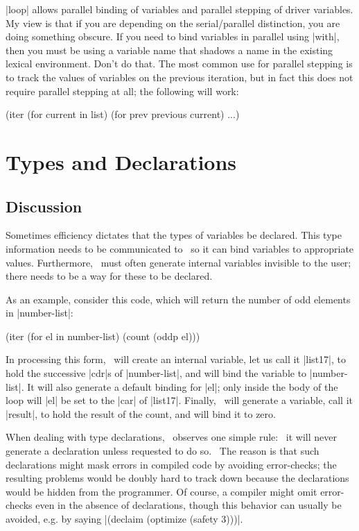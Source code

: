 |loop| allows parallel binding of variables and parallel stepping of
driver variables.  My view is that if you are depending on the 
serial/parallel distinction, you are doing something obscure.  If you
need to bind 
variables in parallel using |with|, then you must be using a
variable name that shadows a name in the existing lexical environment.
Don't do that.  The most common use for parallel stepping is to track
the values of variables on the previous iteration, but in fact this
does not require parallel stepping at all; the following will work:
\begin{program}
(iter (for current in list)
      (for prev previous current)
      ...)
\end{program}


\section{Types and Declarations}
\label{types}

\subsection{Discussion}

Sometimes efficiency dictates that the types of variables be declared.
This type information needs to be communicated to \iter\ so it can
bind variables to appropriate values.  Furthermore, \iter\ must often
generate internal variables invisible to the user; there needs to be a
way for these to be declared.

As an example, consider this code, which will return the number of
odd elements in |number-list|:
\begin{program}
(iter (for el in number-list)
      (count (oddp el)))
\end{program}
In processing this form,
\iter\ will create an internal variable, let us call it |list17|, to
hold the successive |cdr|s of |number-list|, and  
will bind the variable to |number-list|.  It will also generate a
default binding for |el|; only inside the body of the loop will |el|
be set to the |car| of |list17|.  Finally, \iter\ will generate a
variable, call it |result|, to hold the result of the count, and will
bind it to zero.

When dealing with type declarations, \iter\ observes one simple rule:
~it will never generate a declaration unless requested to do so.~  The
reason is that such declarations might mask errors in compiled code by
avoiding error-checks; the resulting problems would be doubly hard to
track down because the declarations would be hidden from the
programmer.  Of course, a compiler might omit error-checks even in the
absence of declarations, though this behavior can usually be avoided,
e.g. by saying |(declaim (optimize (safety 3)))|.

